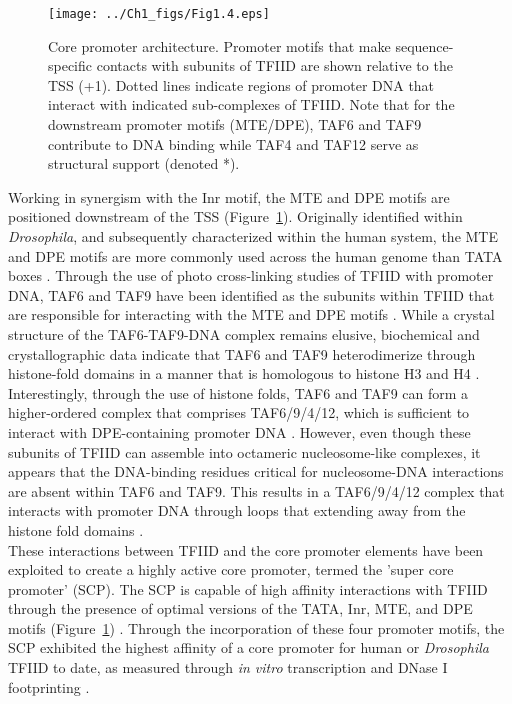 \begin{figure}
\centering
\texttt{[image: ../Ch1\_figs/Fig1.4.eps]}
\caption[Core promoter architecture]{Core promoter architecture. Promoter motifs that make sequence-specific contacts with subunits of TFIID are shown relative to the TSS (+1).  Dotted lines indicate regions of promoter DNA that interact with indicated sub-complexes of TFIID.  Note that for the downstream promoter motifs (MTE/DPE), TAF6 and TAF9 contribute to DNA binding while TAF4 and TAF12 serve as structural support (denoted *).}
\label{fig:Fig1.4}
\end{figure}
\indent Working in synergism with the Inr motif, the MTE and DPE motifs are positioned downstream of the TSS (Figure~\ref{fig:Fig1.4}). Originally identified within \emph{Drosophila}, and subsequently characterized within the human system, the MTE and DPE motifs are more commonly used across the human genome than TATA boxes \cite{Kim_1387}. Through the use of photo cross-linking studies of TFIID with promoter DNA, TAF6 and TAF9  have been identified as the subunits within TFIID that are responsible for interacting with the MTE and DPE motifs \cite{Burke_2739,Lim_1522}. While a crystal structure of the TAF6-TAF9-DNA complex remains elusive, biochemical and crystallographic data indicate that TAF6 and TAF9 heterodimerize through histone-fold domains in a manner that is homologous to histone H3 and H4 \cite{Hoffmann_2911,Xie_2805}. Interestingly, through the use of histone folds, TAF6 and TAF9 can form a higher-ordered complex that comprises TAF6/9/4/12, which is sufficient to interact with DPE-containing promoter DNA \cite{Shao_1340}. However, even though these subunits of TFIID can assemble into octameric nucleosome-like complexes, it appears that the DNA-binding residues critical for nucleosome-DNA interactions are absent within TAF6 and TAF9. This results in a TAF6/9/4/12 complex that interacts with promoter DNA through loops that extending away from the histone fold domains \cite{Shao_1340}. \\
\indent These interactions between TFIID and the core promoter elements have been exploited to create a highly active core promoter, termed the 'super core promoter' (SCP). The SCP is capable of high affinity interactions with TFIID through the presence of optimal versions of the TATA, Inr, MTE, and DPE motifs (Figure~\ref{fig:Fig1.4}) \cite{Juven-Gershon_1249}. Through the incorporation of these four promoter motifs, the SCP exhibited the highest affinity of a core promoter for human or \emph{Drosophila} TFIID to date, as measured through \emph{in vitro} transcription and DNase I footprinting \cite{Juven-Gershon_1249}. 

